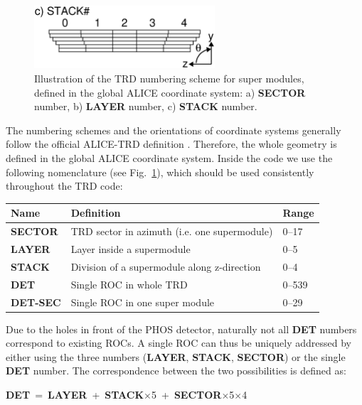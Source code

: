 \documentclass{alicetdr}
\begin{document}
\begin{figure}[htb]
\begin{minipage}[b]{0.49\textwidth}
\begin{center}
\vspace{1.4cm}
\end{center}
\end{minipage}
\begin{center}
\includegraphics[width=0.60\textwidth]{plots/stack_numbering.eps}
\end{center}
\caption{
Illustration of the TRD numbering scheme for super modules, defined in
the global ALICE coordinate system: a) {\bf SECTOR} number, b) 
{\bf LAYER} number, c) {\bf STACK} number.
}
\label{FIG_GEO:sm_numbering}
\end{figure}
%
The numbering schemes and the orientations of coordinate systems generally 
follow the official ALICE-TRD definition \cite{DAVID}.  Therefore, the
whole geometry is defined in the global ALICE coordinate system.
%
Inside the code we use the following nomenclature (see 
Fig.~\ref{FIG_GEO:sm_numbering}), which should be used consistently
throughout the TRD code:
%
\begin{center}
\begin{tabular}{l|l|l}
Name          & Definition                                   & Range  \\ \hline
{\bf SECTOR}  & TRD sector in azimuth (i.e. one supermodule) & 0--17  \\
{\bf LAYER}   & Layer inside a supermodule                   & 0--5   \\
{\bf STACK}   & Division of a supermodule along z-direction  & 0--4   \\
{\bf DET}     & Single ROC in whole TRD                      & 0--539 \\ 
{\bf DET-SEC} & Single ROC in one super module               & 0--29 
\end{tabular}
\end{center}
%
Due to the holes in front of the PHOS detector, naturally not all {\bf DET} 
numbers correspond to existing ROCs.  A single ROC can thus be uniquely 
addressed by either using the three numbers 
({\bf LAYER}, {\bf STACK}, {\bf SECTOR}) or the single {\bf DET} number.
The correspondence between the two possibilities is defined as:
\begin{center}
\mbox{{\bf DET} = {\bf LAYER} + {\bf STACK}$\times$5 + {\bf SECTOR}$\times$5$\times$4}
\end{center}
\end{document}

